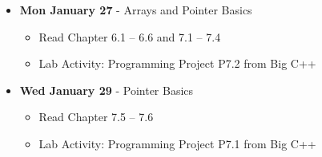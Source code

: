 \begin{itemize}
\item\textbf{Mon January 27} - Arrays and Pointer Basics
    \begin{itemize}
        \item Read Chapter 6.1 -- 6.6 and 7.1 -- 7.4
        \item Lab Activity: Programming Project P7.2 from Big C++
    \end{itemize}
\item\textbf{Wed January 29} - Pointer Basics
    \begin{itemize}
        \item Read Chapter 7.5 -- 7.6
        \item Lab Activity: Programming Project P7.1 from Big C++
    \end{itemize}
\end{itemize}
\hrulefill

